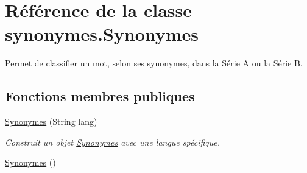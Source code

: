 \hypertarget{classsynonymes_1_1_synonymes}{}\section{Référence de la classe synonymes.\+Synonymes}
\label{classsynonymes_1_1_synonymes}


Permet de classifier un mot, selon ses synonymes, dans la Série A ou la Série B.  


\subsection*{Fonctions membres publiques}
\begin{DoxyCompactItemize}
\item 
\hyperlink{classsynonymes_1_1_synonymes_a3e2d27070b4226a6d9dd2557353c3865}{Synonymes} (String lang)
\begin{DoxyCompactList}\small\item\em Construit un objet \hyperlink{classsynonymes_1_1_synonymes}{Synonymes} avec une langue spécifique. \end{DoxyCompactList}\item 
\hyperlink{classsynonymes_1_1_synonymes_a2a0f489421e0de3f6f6efc5d9ae9234d}{Synonymes} ()\hypertarget{classsynonymes_1_1_synonymes_a2a0f489421e0de3f6f6efc5d9ae9234d}{}\label{classsynonymes_1_1_synonymes_a2a0f489421e0de3f6f6efc5d9ae9234d}


\end{DoxyCompactItemize}
